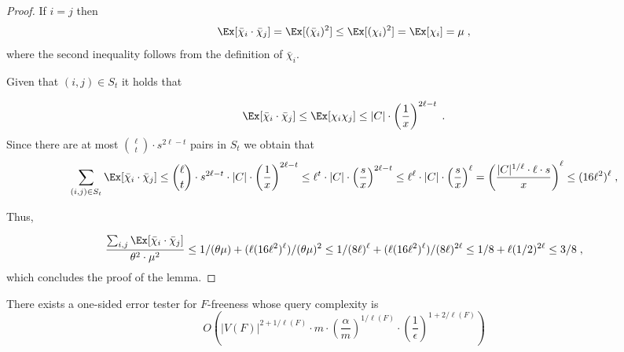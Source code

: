 \begin{proof}
If $i = j$ then 
\begin{equation}\label{eq:cheb-Ck-case2}
\Ex[\bar{\chi}_{i}\cdot \bar{\chi}_{j}] = \Ex[(\bar{\chi}_{i})^2]
\leq \Ex[(\chi_{i})^2] = \Ex[\chi_{i}] = \mu \;,
\end{equation}
where the second inequality follows from the definition of $\bar{\chi}_{i}$.

Given that $(i,j) \in S_t$ it holds that  

\begin{equation}\label{eq:cheb-Ck-case2}
\Ex[\bar{\chi}_{i}\cdot \bar{\chi}_{j}] 
\leq \Ex[\chi_{i} \chi_{j}] \leq  |C| \cdot \left(\frac{1}{x}\right)^{2\ell -t} \;.
\end{equation}
Since there are at most ${\ell \choose t} \cdot s^{2\ell -t}$ pairs in $S_t$ we obtain that 
\begin{equation}\label{eq:cheb-Ck-case2}
\sum_{(i, j)\in S_t}\Ex[\bar{\chi}_{i}\cdot \bar{\chi}_{j}] 
\leq  {\ell \choose t} \cdot s^{2\ell -t} \cdot |C|\cdot   \left(\frac{1}{x}\right)^{2\ell -t} \leq \ell^t \cdot |C| \cdot \left(\frac{s}{x}\right)^{2\ell -t} \leq  \ell^\ell \cdot |C| \cdot   \left(\frac{s}{x}\right)^\ell =  \left( \frac{|C|^{1/\ell} \cdot \ell \cdot s}{x}\right)^\ell \leq (16\ell^2)^\ell\;,
\end{equation}

Thus,

\begin{equation}
\frac{\sum_{i,j} \Ex[\bar{\chi}_{i}\cdot \bar{\chi}_{j}]}{\theta^2\cdot \mu^2}
\leq  1/(\theta \mu) + (\ell (16\ell^2)^\ell)/(\theta \mu)^2 \leq 
1/ (8\ell)^\ell + (\ell (16\ell^2)^\ell)/(8\ell)^{2\ell} \leq 1/8 + \ell (1/2)^{2\ell} \leq 3/8\;,
\end{equation}
which concludes the proof of the lemma.
\end{proof}


\begin{theorem}\label{thm:Gen-F-ub}
There exists a one-sided error tester for $F$-freeness whose query complexity is $$O\left(|V(F)|^{2+1/\ell(F)} \cdot m \cdot \left(\frac{\alpha}{m }\right)^{1/\ell(F)} \cdot \left(\frac{1}{\epsilon}\right)^{1+2/\ell(F)}\right)$$ 
\end{theorem}

